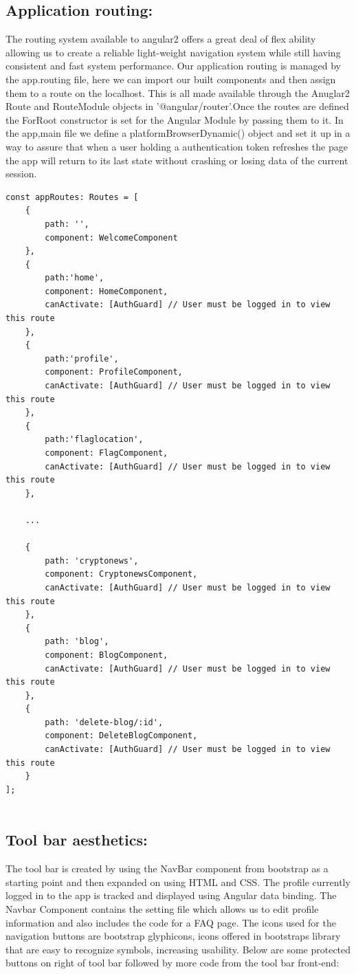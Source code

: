 \subsection{Application routing:}
The routing system available to angular2 offers a great deal of flex ability allowing us to create a reliable light-weight navigation system while still having consistent and fast system performance. Our application routing is managed by the app.routing file, here we can import our built components and then assign them to a route on the localhost. This is all made available through the Anuglar2 Route and RouteModule objects in '@angular/router'.Once the routes are defined the ForRoot constructor is set for the Angular Module by passing them to it. In the app,main file we define a platformBrowserDynamic() object and set it up in a way to assure that when a user holding a authentication token refreshes the page the app will return to its last state without crashing or losing data of the current session.

\begin{lstlisting}
const appRoutes: Routes = [
    {
        path: '',
        component: WelcomeComponent
    },
    {
        path:'home',
        component: HomeComponent,
        canActivate: [AuthGuard] // User must be logged in to view this route
    },
    {
        path:'profile',
        component: ProfileComponent,
        canActivate: [AuthGuard] // User must be logged in to view this route
    },
    {
        path:'flaglocation',
        component: FlagComponent,
        canActivate: [AuthGuard] // User must be logged in to view this route
    },
    
    ...
    
    {
        path: 'cryptonews',
        component: CryptonewsComponent,
        canActivate: [AuthGuard] // User must be logged in to view this route
    },
    {
        path: 'blog',
        component: BlogComponent,
        canActivate: [AuthGuard] // User must be logged in to view this route
    },
    {
        path: 'delete-blog/:id',
        component: DeleteBlogComponent,
        canActivate: [AuthGuard] // User must be logged in to view this route
    }
];
    
\end{lstlisting}

\subsection{Tool bar aesthetics:}
The tool bar is created by using the NavBar component from bootstrap as a starting point and then expanded on using HTML and CSS. The profile currently logged in to the app is tracked and displayed using Angular data binding. The Navbar Component contains the setting file which allows us to edit profile information and also includes the code for a FAQ page. The icons used for the navigation buttons are bootstrap glyphicons, icons offered in bootstraps library that are easy to recognize symbols, increasing usability. Below are some protected buttons on right of tool bar followed by more code from the tool bar front-end:

